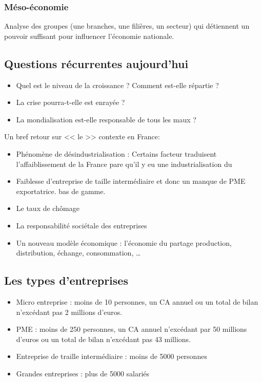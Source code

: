 \documentclass[12pt,a4paper,openany]{book}
\begin{document}
	\subsubsection{Méso-économie}
	Analyse des groupes (une branches, une filières, un secteur) qui détiennent un pouvoir suffisant pour influencer l'économie nationale.

	\subsection{Questions récurrentes aujourd'hui}
	\begin{itemize}
		\item Quel est le niveau de la croissance ? Comment est-elle répartie ? 
		\item La crise pourra-t-elle est enrayée ? 
		\item La mondialisation est-elle responsable de tous les maux ? 
	\end{itemize}

	Un bref retour sur << le >> contexte en France:
	\begin{itemize}
		\item Phénomène de désindustrialisation : Certains facteur traduisent l'affaiblissement de la France pare qu'il y  eu une industrialisation du
		\item Faiblesse d'entreprise de taille intermédiaire et donc un manque de PME exportatrice.  bas de gamme.
		\item Le taux de chômage
		\item La responsabilité sociétale des entreprises
		\item Un nouveau modèle économique : l'économie du partage  production, distribution, échange, consommation, \ldots
	\end{itemize}

	\subsection{Les types d'entreprises}
	\begin{itemize}
		\item Micro entreprise : moins de 10 personnes, un CA annuel ou un total de bilan n'excédant pas 2 millions d'euros.
		\item PME : moins de 250 personnes, un CA annuel n'excédant par 50 millions d'euros ou un total de bilan n'excédant pas 43 millions.
		\item Entreprise de traille intermédiaire : moins de 5000 personnes
		\item Grandes entreprises : plus de 5000 salariés
	\end{itemize}
\end{document}
